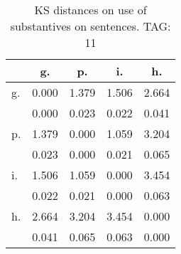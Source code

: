 \begin{table}[h!]
\begin{center}
\begin{tabular}{| l | c | c | c | c |}\hline
 & g. & p. & i. & h. \\\hline
g. & 0.000  & 1.379  & 1.506  & 2.664 \\\hline
 & 0.000  & 0.023  & 0.022  & 0.041 \\\hline
p. & 1.379  & 0.000  & 1.059  & 3.204 \\\hline
 & 0.023  & 0.000  & 0.021  & 0.065 \\\hline
i. & 1.506  & 1.059  & 0.000  & 3.454 \\\hline
 & 0.022  & 0.021  & 0.000  & 0.063 \\\hline
h. & 2.664  & 3.204  & 3.454  & 0.000 \\\hline
 & 0.041  & 0.065  & 0.063  & 0.000 \\\hline
\end{tabular}
\caption{KS distances on use of substantives on sentences. TAG: 11}
\end{center}
\end{table}